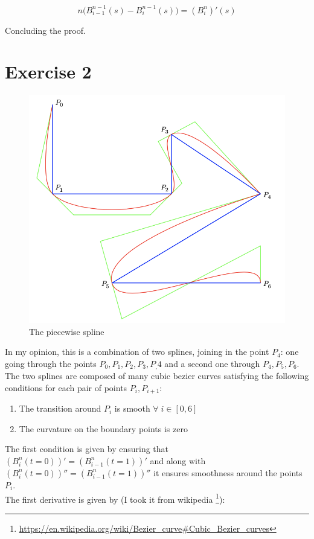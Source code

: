 \documentclass[12pt]{article}
\begin{document}
$$ n \bigg(B_{i-1}^{n-1}(s) - B_{i}^{n-1}(s)  \bigg) = (B^n_i)'(s)$$

Concluding the proof. \\

\section*{Exercise 2}

\begin{figure}[H]
	\centering
	\includegraphics[width=0.7\columnwidth]{exercise2.png}
	\caption{The piecewise spline}
	\label{fig:ex2}
\end{figure}

In my opinion, this is a combination of two splines, joining in the point $P_4$: one going through the points $P_0, P_1, P_2, P_3, P_,4$ and a second one through $P_4, P_5, P_6$. The two splines are composed of many cubic bezier curves satisfying the following conditions for each pair of points $P_i, P_{i+1}$:

\begin{enumerate}
	\item The transition around $P_i$ is smooth $\forall \; i \in [0, 6]$
	\item The curvature on the boundary points is zero
\end{enumerate}

The first condition is given by ensuring that $(B^n_{i}(t=0))' = (B^n_{i-1}(t=1))'$ and along with $(B^n_{i}(t=0))'' = (B^n_{i-1}(t=1))''$ it ensures smoothness around the points $P_i$. \\

The first derivative is given by (I took it from wikipedia \footnote{\url{https://en.wikipedia.org/wiki/Bezier_curve#Cubic_Bezier_curves}}): 
\end{document}
